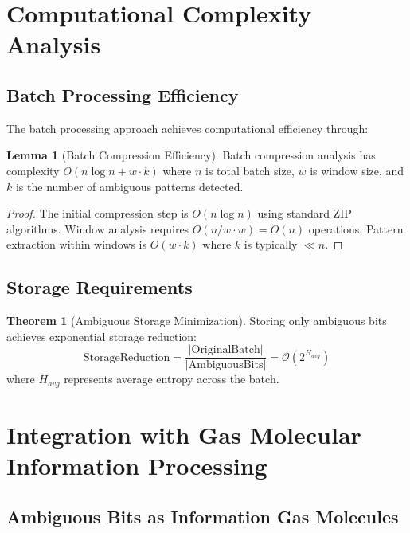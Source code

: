 \documentclass[12pt,a4paper]{article}
\theoremstyle{definition}
\newtheorem{theorem}{Theorem}
\newtheorem{lemma}{Lemma}
\begin{document}
\section{Computational Complexity Analysis}

\subsection{Batch Processing Efficiency}

The batch processing approach achieves computational efficiency through:

\begin{lemma}[Batch Compression Efficiency]
Batch compression analysis has complexity $O(n \log n + w \cdot k)$ where $n$ is total batch size, $w$ is window size, and $k$ is the number of ambiguous patterns detected.
\end{lemma}

\begin{proof}
The initial compression step is $O(n \log n)$ using standard ZIP algorithms. Window analysis requires $O(n/w \cdot w) = O(n)$ operations. Pattern extraction within windows is $O(w \cdot k)$ where $k$ is typically $\ll n$.
\end{proof}

\subsection{Storage Requirements}

\begin{theorem}[Ambiguous Storage Minimization]
Storing only ambiguous bits achieves exponential storage reduction:
\begin{equation}
\text{StorageReduction} = \frac{|\text{OriginalBatch}|}{|\text{AmbiguousBits}|} = \mathcal{O}(2^{H_{avg}})
\end{equation}
where $H_{avg}$ represents average entropy across the batch.
\end{theorem}

\section{Integration with Gas Molecular Information Processing}

\subsection{Ambiguous Bits as Information Gas Molecules}
\end{document}
